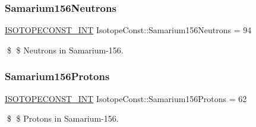 \subsubsection{\texorpdfstring{Samarium156\+Neutrons}{Samarium156Neutrons}}
{\footnotesize\ttfamily \mbox{\hyperlink{group___isotope_const-_macros_ga5f18360b3e99483a35c32d789e62621c}{I\+S\+O\+T\+O\+P\+E\+C\+O\+N\+S\+T\+\_\+\+I\+NT}} Isotope\+Const\+::\+Samarium156\+Neutrons = 94}

\$ \$ Neutrons in Samarium-\/156. \mbox{\label{group___isotope_const-_samarium-_sm156_gadf73b6640faaa460ba67560850e86766}} 
\subsubsection{\texorpdfstring{Samarium156\+Protons}{Samarium156Protons}}
{\footnotesize\ttfamily \mbox{\hyperlink{group___isotope_const-_macros_ga5f18360b3e99483a35c32d789e62621c}{I\+S\+O\+T\+O\+P\+E\+C\+O\+N\+S\+T\+\_\+\+I\+NT}} Isotope\+Const\+::\+Samarium156\+Protons = 62}

\$ \$ Protons in Samarium-\/156. 